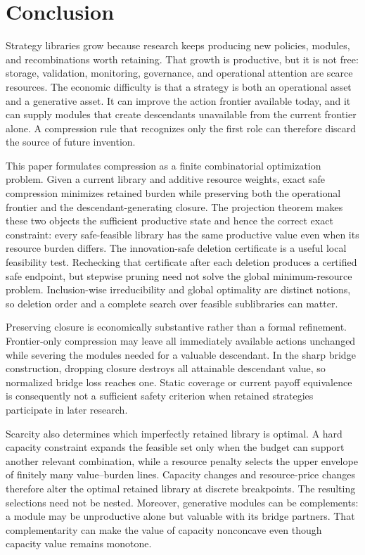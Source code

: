\section{Conclusion}\label{sec:conclusion}

Strategy libraries grow because research keeps producing new policies,
modules, and recombinations worth retaining. That growth is productive, but
it is not free: storage, validation, monitoring, governance, and operational
attention are scarce resources. The economic difficulty is that a
strategy is both an operational asset and a generative asset. It can improve
the action frontier available today, and it can supply modules that create
descendants unavailable from the current frontier alone. A compression rule
that recognizes only the first role can therefore discard the source of
future invention.

This paper formulates compression as a finite combinatorial optimization
problem. Given a current library and additive resource weights, exact safe
compression minimizes retained burden while preserving both the operational
frontier and the descendant-generating closure. The projection theorem makes
these two objects the sufficient productive state and hence the correct exact
constraint: every safe-feasible library has the same productive value even
when its resource burden differs. The innovation-safe deletion certificate is
a useful local feasibility test. Rechecking that certificate after each
deletion produces a certified safe endpoint, but stepwise pruning need not
solve the global minimum-resource problem. Inclusion-wise irreducibility and
global optimality are distinct notions, so deletion order and a complete
search over feasible sublibraries can matter.

Preserving closure is economically substantive rather than a formal
refinement. Frontier-only compression may leave all immediately available
actions unchanged while severing the modules needed for a valuable
descendant. In the sharp bridge construction, dropping closure destroys all
attainable descendant value, so normalized bridge loss reaches one. Static
coverage or current payoff equivalence is consequently not a sufficient
safety criterion when retained strategies participate in later research.

Scarcity also determines which imperfectly retained library is optimal. A
hard capacity constraint expands the feasible set only when the budget can
support another relevant combination, while a resource penalty selects the
upper envelope of finitely many value--burden lines. Capacity changes and
resource-price changes therefore alter the optimal retained library at
discrete breakpoints. The resulting selections need not be nested. Moreover,
generative modules can be complements: a module may be unproductive alone
but valuable with its bridge partners. That complementarity can make the
value of capacity nonconcave even though capacity value remains monotone.

